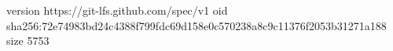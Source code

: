 version https://git-lfs.github.com/spec/v1
oid sha256:72e74983bd24c4388f799fdc69d158e0c570238a8c9c11376f2053b31271a188
size 5753
